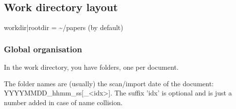\documentclass[10pt,a4paper]{article}
\begin{document}
\subsection{Work directory layout}

workdir|rootdir = \textasciitilde /papers (by default)

\subsubsection{Global organisation}

In the work directory, you have folders, one per document.

The folder names are (usually) the scan/import date of the document:
YYYYMMDD\_hhmm\_ss{[}\_<idx>{]}. The suffix 'idx' is optional and
is just a number added in case of name collision.
\end{document}
